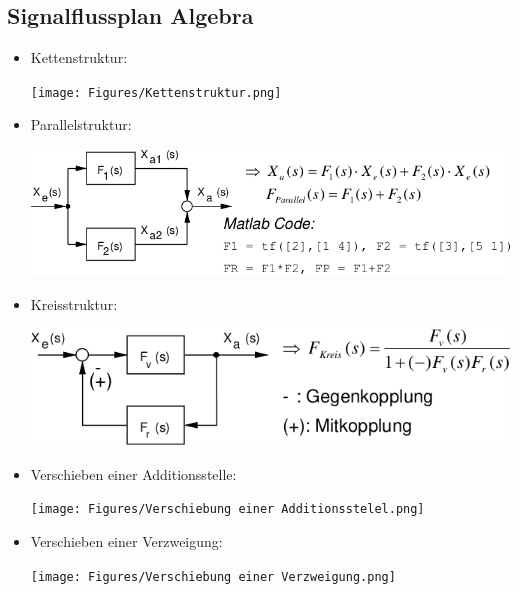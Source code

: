 \subsection{Signalflussplan Algebra}
\begin{itemize}[leftmargin=*]
	\item Kettenstruktur:
	      \begin{center}
		      \texttt{[image: Figures/Kettenstruktur.png]}
	      \end{center}

	\item Parallelstruktur:
	      \begin{center}
		      \includegraphics[width=0.96\columnwidth]{Figures/Parallelstruktur.png}
	      \end{center}

	\item Kreisstruktur:
	      \begin{center}
		      \includegraphics[width=0.96\columnwidth]{Figures/Kreisstruktur.png}
	      \end{center}

	\item Verschieben einer Additionsstelle:
	      \begin{center}
		      \texttt{[image: Figures/Verschiebung einer Additionsstelel.png]}
	      \end{center}

	\item Verschieben einer Verzweigung:
	      \begin{center}
		      \texttt{[image: Figures/Verschiebung einer Verzweigung.png]}
	      \end{center}
\end{itemize}
